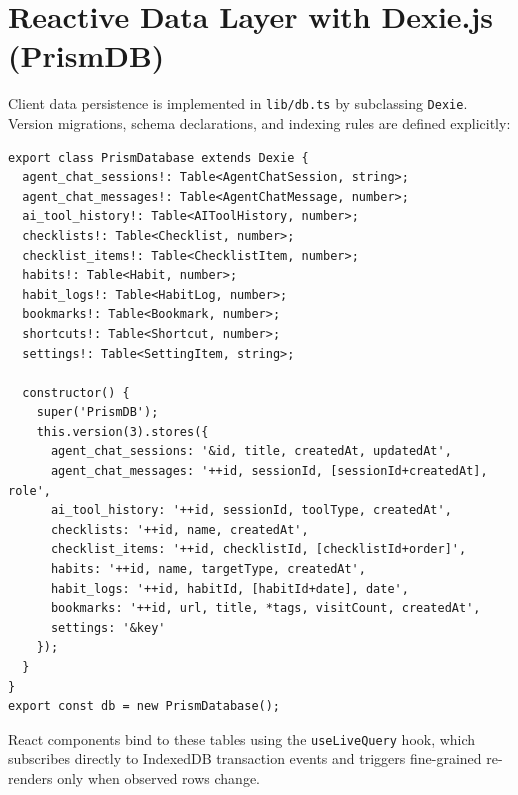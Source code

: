 \documentclass[12pt,a4paper]{report}
\begin{document}
\section{Reactive Data Layer with Dexie.js (PrismDB)}
Client data persistence is implemented in \texttt{lib/db.ts} by subclassing \texttt{Dexie}. Version migrations, schema declarations, and indexing rules are defined explicitly:

\begin{singlespace}\small
\begin{verbatim}
export class PrismDatabase extends Dexie {
  agent_chat_sessions!: Table<AgentChatSession, string>;
  agent_chat_messages!: Table<AgentChatMessage, number>;
  ai_tool_history!: Table<AIToolHistory, number>;
  checklists!: Table<Checklist, number>;
  checklist_items!: Table<ChecklistItem, number>;
  habits!: Table<Habit, number>;
  habit_logs!: Table<HabitLog, number>;
  bookmarks!: Table<Bookmark, number>;
  shortcuts!: Table<Shortcut, number>;
  settings!: Table<SettingItem, string>;

  constructor() {
    super('PrismDB');
    this.version(3).stores({
      agent_chat_sessions: '&id, title, createdAt, updatedAt',
      agent_chat_messages: '++id, sessionId, [sessionId+createdAt], role',
      ai_tool_history: '++id, sessionId, toolType, createdAt',
      checklists: '++id, name, createdAt',
      checklist_items: '++id, checklistId, [checklistId+order]',
      habits: '++id, name, targetType, createdAt',
      habit_logs: '++id, habitId, [habitId+date], date',
      bookmarks: '++id, url, title, *tags, visitCount, createdAt',
      settings: '&key'
    });
  }
}
export const db = new PrismDatabase();
\end{verbatim}
\end{singlespace}

React components bind to these tables using the \texttt{useLiveQuery} hook, which subscribes directly to IndexedDB transaction events and triggers fine-grained re-renders only when observed rows change.
\end{document}
